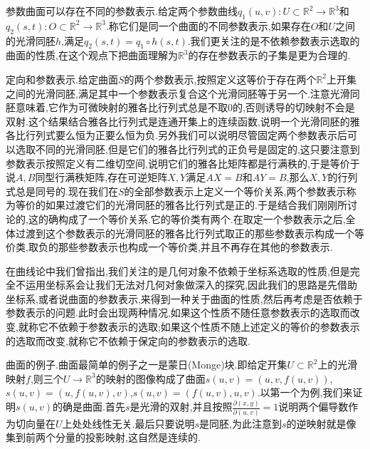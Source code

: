 参数曲面可以存在不同的参数表示.给定两个参数曲线$q_1(u,v):U\subset\mathbb{R}^2\to\mathbb{R}^3$和$q_2(s,t):O\subset\mathbb{R}^2\to\mathbb{R}^3$.称它们是同一个曲面的不同参数表示,如果存在$O$和$U$之间的光滑同胚$h$,满足$q_2(s,t)=q_1\circ h(s,t)$.我们更关注的是不依赖参数表示选取的曲面的性质,在这个观点下把曲面理解为$\mathbb{R}^3$的存在参数表示的子集是更为合理的.

定向和参数表示.给定曲面$S$的两个参数表示,按照定义这等价于存在两个$\mathbb{R}^2$上开集之间的光滑同胚,满足其中一个参数表示复合这个光滑同胚等于另一个.注意光滑同胚意味着,它作为可微映射的雅各比行列式总是不取0的,否则诱导的切映射不会是双射.这个结果结合雅各比行列式是连通开集上的连续函数,说明一个光滑同胚的雅各比行列式要么恒为正要么恒为负.另外我们可以说明尽管固定两个参数表示后可以选取不同的光滑同胚,但是它们的雅各比行列式的正负号是固定的,这只要注意到参数表示按照定义有二维切空间,说明它们的雅各比矩阵都是行满秩的,于是等价于说$A,B$同型行满秩矩阵,存在可逆矩阵$X,Y$满足$AX=B$和$AY=B$,那么$X,Y$的行列式总是同号的.现在我们在$S$的全部参数表示上定义一个等价关系,两个参数表示称为等价的如果过渡它们的光滑同胚的雅各比行列式是正的.于是结合我们刚刚所讨论的,这的确构成了一个等价关系.它的等价类有两个.在取定一个参数表示之后,全体过渡到这个参数表示的光滑同胚的雅各比行列式取正的那些参数表示构成一个等价类,取负的那些参数表示也构成一个等价类,并且不再存在其他的参数表示.

在曲线论中我们曾指出,我们关注的是几何对象不依赖于坐标系选取的性质,但是完全不运用坐标系会让我们无法对几何对象做深入的探究,因此我们的思路是先借助坐标系,或者说曲面的参数表示,来得到一种关于曲面的性质,然后再考虑是否依赖于参数表示的问题.此时会出现两种情况,如果这个性质不随任意参数表示的选取而改变,就称它不依赖于参数表示的选取;如果这个性质不随上述定义的等价的参数表示的选取而改变,就称它不依赖于保定向的参数表示的选取.

曲面的例子.曲面最简单的例子之一是蒙日(Monge)块.即给定开集$U\subset\mathbb{R}^2$上的光滑映射$f$,则三个$U\to\mathbb{R}^3$的映射的图像构成了曲面$s(u,v)=(u,v,f(u,v))$,$s(u,v)=(u,f(u,v),v)$,$s(u,v)=(f(u,v),u,v)$.以第一个为例,我们来证明$s(u,v)$的确是曲面.首先$s$是光滑的双射,并且按照$\frac{\partial(x,y)}{\partial(u,v)}=1$说明两个偏导数作为切向量在$U$上处处线性无关.最后只要说明$s$是同胚,为此注意到$s$的逆映射就是像集到前两个分量的投影映射,这自然是连续的.

